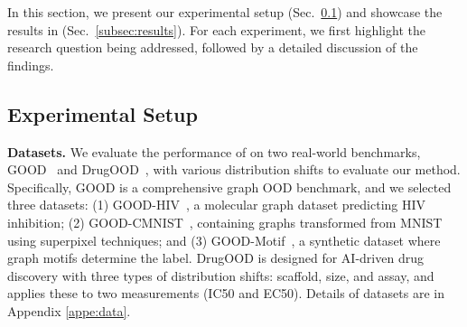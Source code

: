 
In this section, we present our experimental setup  (Sec.~\ref{subsec:setup}) and showcase the results in (Sec.~\ref{subsec:results}). For each experiment, we first highlight the research question being addressed, followed by a detailed discussion of the findings.




\subsection{Experimental Setup}\label{subsec:setup}
\textbf{Datasets.} We evaluate the performance of \ourmethod on two real-world benchmarks, GOOD~\citep{good} and DrugOOD~\citep{drugood}, with various distribution shifts to evaluate our method. Specifically, GOOD is a comprehensive graph OOD benchmark, and we selected three datasets: (1) GOOD-HIV~\citep{wu2018moleculenet}, a molecular graph dataset predicting HIV inhibition; (2) GOOD-CMNIST~\citep{arjovsky2019invariant}, containing graphs transformed from MNIST using superpixel techniques; and (3) GOOD-Motif~\citep{wu2022discovering}, a synthetic dataset where graph motifs determine the label. DrugOOD is designed for AI-driven drug discovery with three types of distribution shifts: scaffold, size, and assay, and applies these to two measurements (IC50 and EC50). Details of datasets are in Appendix \ref{appe:data}.%

